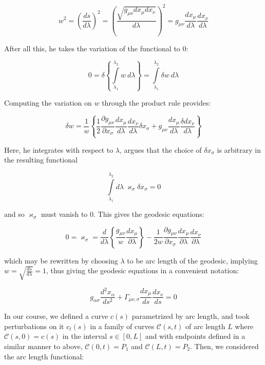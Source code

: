 \documentclass[14pt]{extarticle}
\newcommand{\christoffelone}[2]{\Gamma_{#1,#2}}
\begin{document}
\[w^{2}
= \left( \frac{ds}{d\lambda} \right)^2
= \left(\frac{\sqrt{g_{\mu \nu} dx_\mu dx_\nu}}{d\lambda}\right)^2
= g_{\mu \nu }{\frac {dx_{\mu }}{d\lambda }}{\frac {dx_{\nu }}{d\lambda }}\]

After all this, he takes the variation of the functional to 0:

\[0 = \delta \left\{ \int \limits _{\lambda _{1}}^{\lambda _{2}} w\ d\lambda \right\}
= \int \limits _{\lambda _{1}}^{\lambda _{2}}\delta w\ d\lambda\]

Computing the variation on $w$ through the product rule provides:

\[\delta w={\frac {1}{w}}\left\{{\frac {1}{2}}{\frac {\partial g_{\mu \nu }}{\partial x_{\sigma }}}{\frac {dx_{\mu }}{d\lambda }}{\frac {dx_{\nu }}{d\lambda }}\delta x_{\sigma }+g_{\mu \nu }{\frac {dx_{\mu }}{d\lambda }} {\frac {\delta dx_{\nu }}{d\lambda }}\right\}\]

Here, he integrates with respect to $\lambda$, argues that the choice of $\delta x_\sigma$ is arbitrary in the resulting functional

\[\int \limits _{\lambda _{1}}^{\lambda _{2}}d\lambda \ \varkappa _{\sigma }\delta x_{\sigma }=0\]

\noindent
and so $\varkappa_{\sigma}$ must vanish to 0. This gives the geodesic equations:

\[0 = \varkappa_{\sigma} = {\frac {d}{d\lambda }}\left\{{\frac {g_{\mu \nu }}{w}}{\frac {dx_{\mu }}{\partial \lambda }}\right\}-{\frac {1}{2w}}{\frac {\partial g_{\mu \nu }}{\partial x_{\sigma }}}{\frac {dx_{\mu }}{\partial \lambda }}{\frac {dx_{\nu }}{\partial \lambda }}
\]

\noindent
which may be rewritten by choosing $\lambda$ to be arc length of the geodesic, implying $w = \sqrt{\frac{ds}{d\lambda}} = 1$, thus giving the geodesic equations in a convenient notation:

\[g_{\alpha \sigma }{\frac {d^{2}x_{\alpha }}{ds^{2}}}+
\christoffelone{\mu\nu}{\sigma}
{\frac {dx_{\mu }}{ds}}{\frac {dx_{\nu }}{ds}} = 0\]

In our course, we defined a curve $c(s)$ parametrized by arc length, and took perturbations on it $c_t(s)$ in a family of curves $\mathscr{C}(s, t)$ of arc length $L$ where $\mathscr{C}(s, 0) = c(s)$ in the interval $s \in [0, L]$ and with endpoints defined in a similar manner to above, ${\mathscr{C}(0,t) = P_1}$ and ${\mathscr{C}(L,t) = P_2}$. Then, we considered the arc length functional:
\end{document}

